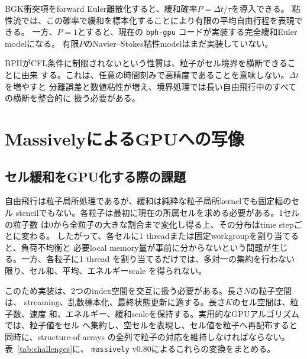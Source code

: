 \documentclass[a4paper,11pt]{ltjsarticle}
\newcommand{\bphgpu}{\texttt{bph-gpu}\xspace}
\newcommand{\massively}{\texttt{massively}\xspace}
\begin{document}
BGK衝突項をforward Euler離散化すると、緩和確率$P=\Delta t/\tau$を導入できる。
粘性流では、この確率で緩和を標本化することにより有限の平均自由行程を表現できる。
一方、$P=1$とすると、現在の \bphgpu コードが実装する完全緩和Euler modelになる。
有限$P$のNavier--Stokes粘性modelはまだ実装していない。

BPHがCFL条件に制限されないという性質は、粒子がセル境界を横断できることに由来
する。これは、任意の時間刻みで高精度であることを意味しない。$\Delta t$を増やすと
分離誤差と数値粘性が増え、境界処理では長い自由飛行中のすべての横断を整合的に
扱う必要がある。

\section{MassivelyによるGPUへの写像}

\subsection{セル緩和をGPU化する際の課題}

自由飛行は粒子局所処理であるが、緩和は純粋な粒子局所kernelでも固定幅のセル
stencilでもない。各粒子は最初に現在の所属セルを求める必要がある。1セルの粒子数
は0から全粒子の大きな割合まで変化し得る上、その分布はtime stepごとに変わる。
したがって、各セルに1 threadまたは固定workgroupを割り当てると、負荷不均衡と
必要local memory量が事前に分からないという問題が生じる。一方、各粒子に1 thread
を割り当てるだけでは、多対一の集約を行わない限り、セル和、平均、エネルギーscale
を得られない。

このため実装は、2つのindex空間を交互に扱う必要がある。長さ$N$の粒子空間は、
streaming、乱数標本化、最終状態更新に適する。長さ$K$のセル空間は、粒子数、速度
和、エネルギー、緩和scaleを保持する。実用的なGPUアルゴリズムでは、粒子値をセル
へ集約し、空セルを表現し、セル値を粒子へ再配布すると同時に、structure-of-arrays
の全列で粒子の対応を維持しなければならない。表~\ref{tab:challenges}に、
\massively v0.80によるこれらの変換をまとめる。
\end{document}
